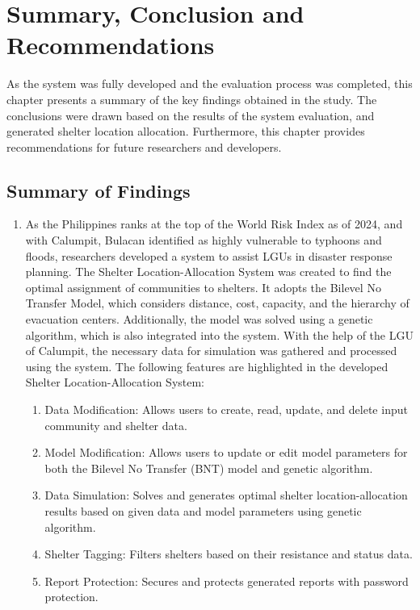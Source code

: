 \chapter{Summary, Conclusion and Recommendations}
	As the system was fully developed and the evaluation process was completed, this chapter presents a summary of the key findings obtained in the study. The conclusions were drawn based on the results of the system evaluation, and generated shelter location allocation. Furthermore, this chapter provides recommendations for future researchers and developers.

\section{Summary of Findings}
	\begin{enumerate}
	\item As the Philippines ranks at the top of the World Risk Index as of 2024, and with Calumpit, Bulacan identified as highly vulnerable to typhoons and floods, researchers developed a system to assist LGUs in disaster response planning. The Shelter Location-Allocation System was created to find the optimal assignment of communities to shelters. It adopts the Bilevel No Transfer Model, which considers distance, cost, capacity, and the hierarchy of evacuation centers. Additionally, the model was solved using a genetic algorithm, which is also integrated into the system. With the help of the LGU of Calumpit, the necessary data for simulation was gathered and processed using the system. The following features are highlighted in the developed Shelter Location-Allocation System:
	\begin{enumerate}[label*=\arabic*]
		\item Data Modification: Allows users to create, read, update, and delete input community and shelter data.
		\item Model Modification: Allows users to update or edit model parameters for both the Bilevel No Transfer (BNT) model and genetic algorithm.
		\item Data Simulation: Solves and generates optimal shelter location-allocation results based on given data and model parameters using genetic algorithm.
		\item Shelter Tagging: Filters shelters based on their resistance and status data.
		\item Report Protection: Secures and protects generated reports with password protection.
	\end{enumerate}
	

\end{enumerate}
